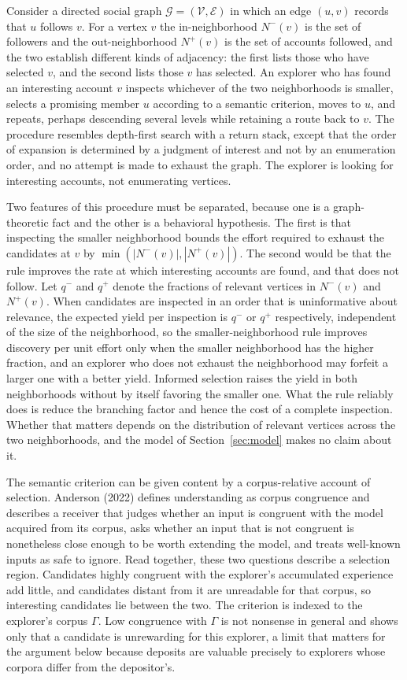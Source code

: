 \documentclass[11pt]{article}
\theoremstyle{definition}
\theoremstyle{remark}
\begin{document}
Consider a directed social graph $\mathcal{G}=(\mathcal{V},\mathcal{E})$ in which an edge $(u,v)$ records that $u$ follows $v$. For a vertex $v$ the in-neighborhood $N^-(v)$ is the set of followers and the out-neighborhood $N^+(v)$ is the set of accounts followed, and the two establish different kinds of adjacency: the first lists those who have selected $v$, and the second lists those $v$ has selected. An explorer who has found an interesting account $v$ inspects whichever of the two neighborhoods is smaller, selects a promising member $u$ according to a semantic criterion, moves to $u$, and repeats, perhaps descending several levels while retaining a route back to $v$. The procedure resembles depth-first search with a return stack, except that the order of expansion is determined by a judgment of interest and not by an enumeration order, and no attempt is made to exhaust the graph. The explorer is looking for interesting accounts, not enumerating vertices.

Two features of this procedure must be separated, because one is a graph-theoretic fact and the other is a behavioral hypothesis. The first is that inspecting the smaller neighborhood bounds the effort required to exhaust the candidates at $v$ by $\min(|N^-(v)|,|N^+(v)|)$. The second would be that the rule improves the rate at which interesting accounts are found, and that does not follow. Let $q^-$ and $q^+$ denote the fractions of relevant vertices in $N^-(v)$ and $N^+(v)$. When candidates are inspected in an order that is uninformative about relevance, the expected yield per inspection is $q^-$ or $q^+$ respectively, independent of the size of the neighborhood, so the smaller-neighborhood rule improves discovery per unit effort only when the smaller neighborhood has the higher fraction, and an explorer who does not exhaust the neighborhood may forfeit a larger one with a better yield. Informed selection raises the yield in both neighborhoods without by itself favoring the smaller one. What the rule reliably does is reduce the branching factor and hence the cost of a complete inspection. Whether that matters depends on the distribution of relevant vertices across the two neighborhoods, and the model of Section~\ref{sec:model} makes no claim about it.

The semantic criterion can be given content by a corpus-relative account of selection. Anderson (2022) defines understanding as corpus congruence and describes a receiver that judges whether an input is congruent with the model acquired from its corpus, asks whether an input that is not congruent is nonetheless close enough to be worth extending the model, and treats well-known inputs as safe to ignore. Read together, these two questions describe a selection region. Candidates highly congruent with the explorer's accumulated experience add little, and candidates distant from it are unreadable for that corpus, so interesting candidates lie between the two. The criterion is indexed to the explorer's corpus $\Gamma$. Low congruence with $\Gamma$ is not nonsense in general and shows only that a candidate is unrewarding for this explorer, a limit that matters for the argument below because deposits are valuable precisely to explorers whose corpora differ from the depositor's.
\end{document}
